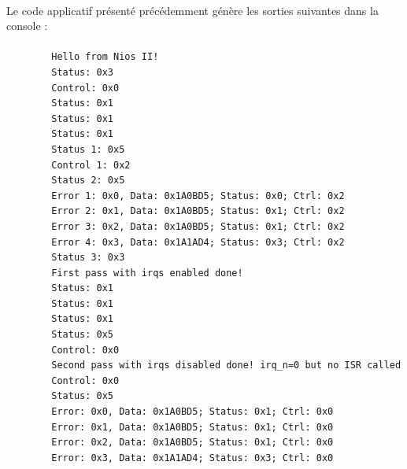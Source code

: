 \documentclass[a4paper, 11pt, svgnames]{report}
\begin{document}
        \paragraph{}
        Le code applicatif présenté précédemment génère les sorties suivantes dans la console :

        \paragraph{}
        \begin{verbatim}
        Hello from Nios II!
        Status: 0x3
        Control: 0x0
        Status: 0x1
        Status: 0x1
        Status: 0x1
        Status 1: 0x5
        Control 1: 0x2
        Status 2: 0x5
        Error 1: 0x0, Data: 0x1A0BD5; Status: 0x0; Ctrl: 0x2
        Error 2: 0x1, Data: 0x1A0BD5; Status: 0x1; Ctrl: 0x2
        Error 3: 0x2, Data: 0x1A0BD5; Status: 0x1; Ctrl: 0x2
        Error 4: 0x3, Data: 0x1A1AD4; Status: 0x3; Ctrl: 0x2
        Status 3: 0x3
        First pass with irqs enabled done!
        Status: 0x1
        Status: 0x1
        Status: 0x1
        Status: 0x5
        Control: 0x0
        Second pass with irqs disabled done! irq_n=0 but no ISR called
        Control: 0x0
        Status: 0x5
        Error: 0x0, Data: 0x1A0BD5; Status: 0x1; Ctrl: 0x0
        Error: 0x1, Data: 0x1A0BD5; Status: 0x1; Ctrl: 0x0
        Error: 0x2, Data: 0x1A0BD5; Status: 0x1; Ctrl: 0x0
        Error: 0x3, Data: 0x1A1AD4; Status: 0x3; Ctrl: 0x0
        \end{verbatim}
\end{document}
